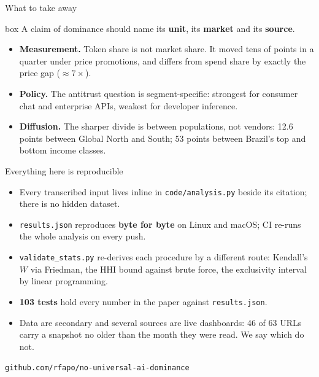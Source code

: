 \documentclass[aspectratio=169,11pt]{beamer}
\newcommand{\lead}[1]{{\color{accent}\textbf{#1}}}
\begin{document}
\begin{frame}{What to take away}
  \vspace{0.8em}
  \begin{beamercolorbox}[wd=\textwidth,sep=1.1em]{box}
    \color{ink}\large
    A claim of dominance should name its \lead{unit}, its \lead{market} and its \lead{source}.
  \end{beamercolorbox}
  \vspace{1.0em}
  \begin{itemize}\setlength\itemsep{0.4em}
    \item \textbf{Measurement.} Token share is not market share. It moved tens of points in a
      quarter under price promotions, and differs from spend share by exactly the price gap ($\approx 7\times$).
    \item \textbf{Policy.} The antitrust question is segment-specific: strongest for consumer
      chat and enterprise APIs, weakest for developer inference.
    \item \textbf{Diffusion.} The sharper divide is between populations, not vendors: 12.6 points
      between Global North and South; 53 points between Brazil's top and bottom income classes.
  \end{itemize}
\end{frame}

\begin{frame}{Everything here is reproducible}
  \vspace{0.7em}
  \begin{itemize}\setlength\itemsep{0.45em}
    \item Every transcribed input lives inline in \texttt{code/analysis.py} beside its citation;
      there is no hidden dataset.
    \item \texttt{results.json} reproduces \lead{byte for byte} on Linux and macOS; CI re-runs the
      whole analysis on every push.
    \item \texttt{validate\_stats.py} re-derives each procedure by a different route:
      Kendall's $W$ via Friedman, the HHI bound against brute force, the exclusivity interval by linear programming.
    \item \lead{103 tests} hold every number in the paper against \texttt{results.json}.
    \item Data are secondary and several sources are live dashboards: 46 of 63 URLs carry a
      snapshot no older than the month they were read. We say which do not.
  \end{itemize}
  \vspace{0.9em}
  \begin{center}\small\texttt{github.com/rfapo/no-universal-ai-dominance}\end{center}
\end{frame}
\end{document}
